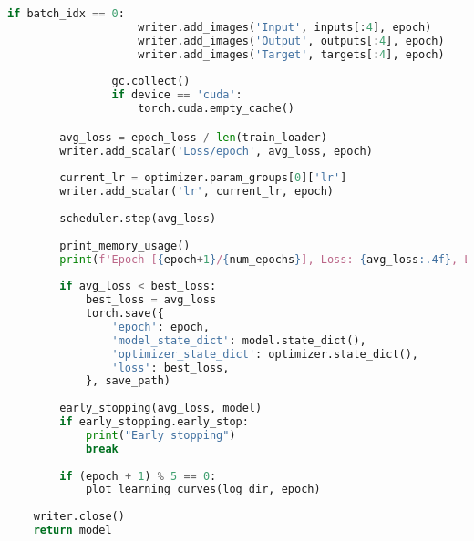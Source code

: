 \documentclass{apmcmthesis}
\begin{document}
\begin{lstlisting}[language=python,caption={Training Script}]
                if batch_idx == 0:
                    writer.add_images('Input', inputs[:4], epoch)
                    writer.add_images('Output', outputs[:4], epoch)
                    writer.add_images('Target', targets[:4], epoch)
                    
                gc.collect()
                if device == 'cuda':
                    torch.cuda.empty_cache()

        avg_loss = epoch_loss / len(train_loader)
        writer.add_scalar('Loss/epoch', avg_loss, epoch)
        
        current_lr = optimizer.param_groups[0]['lr']
        writer.add_scalar('lr', current_lr, epoch)
        
        scheduler.step(avg_loss)
        
        print_memory_usage()
        print(f'Epoch [{epoch+1}/{num_epochs}], Loss: {avg_loss:.4f}, LR: {current_lr:.6f}')
        
        if avg_loss < best_loss:
            best_loss = avg_loss
            torch.save({
                'epoch': epoch,
                'model_state_dict': model.state_dict(),
                'optimizer_state_dict': optimizer.state_dict(),
                'loss': best_loss,
            }, save_path)
        
        early_stopping(avg_loss, model)
        if early_stopping.early_stop:
            print("Early stopping")
            break
        
        if (epoch + 1) % 5 == 0:
            plot_learning_curves(log_dir, epoch)
    
    writer.close()
    return model

\end{lstlisting}
\end{document}
